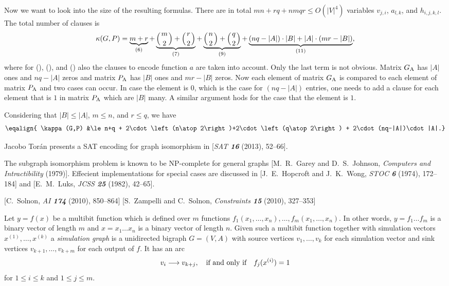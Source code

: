 \medskip{}  Now we want to look into the
size of the resulting formulas.  There are in total $mn+rq+nmqr\le O(|V|^4)$
variables $v_{j,i}$, $a_{l,k}$, and $h_{i,j,k,l}$.  The total number of clauses
is
$$
  \kappa(G,P)=
  \underbrace{m+r}_{(6)}
  + \underbrace{\left(m\atop 2\right)+\left(r\atop 2\right)}_{(7)}
  + \underbrace{\left(n\atop 2\right)+\left(q\atop 2\right)}_{(9)}
  + \underbrace{(nq-|A|)\cdot|B|+|A|\cdot(mr-|B|)}_{(11)},
$$
where for (\eqonehota), (\eqonehotb), and (\eqonehotc) also the clauses to
encode function $a$ are taken into account.  Only the last term is not obvious.
Matrix $G_{\rm A}$ has $|A|$ ones and $nq-|A|$ zeros and matrix $P_{\rm A}$ has
$|B|$ ones and $mr-|B|$ zeros.  Now each element of matrix $G_{\rm A}$ is
compared to each element of matrix $P_{\rm A}$ and two cases can occur. In case
the element is $0$, which is the case for $(nq-|A|)$ entries, one needs to add a
clause for each element that is $1$ in matrix $P_{\rm A}$ which are $|B|$ many.
A similar argument hods for the case that the element is $1$.

Considering that $|B|\le |A|$, $m\le n$, and $r\le q$, we have
$$
  \eqalign{
  \kappa(G,P) &\le
  n+q
  + 2\cdot\left(n\atop 2\right)+2\cdot\left(q\atop 2\right)
  + 2\cdot (nq-|A|)\cdot |A|.}
$$

\medskip{}


\medskip{}  Jacobo Tor\'an presents a SAT encoding
for graph isomorphism in [{\sl SAT\/ \bf 16} (2013), 52--66].

The subgraph isomorphism problem is known to be NP-complete for general graphs
[M.\ R.\ Garey and D.\ S.\ Johnson, {\sl Computers and Intractibility} (1979)].
Effecient implementations for special cases are discussed in [J.\ E.\ Hopcroft
and J.\ K.\ Wong, {\sl STOC\/ \bf 6} (1974), 172--184] and [E.\ M.\ Luks, {\sl
JCSS\/ \bf 25} (1982), 42--65].

[C.\ Solnon, {\sl AI\/ \bf 174} (2010), 850--864]  [S.\ Zampelli and C.\ Solnon, {\sl Constraints\/ \bf 15} (2010), 327--353]

\medskip{}  Let $y=f(x)$ be a multibit
function which is defined over $m$ functions $f_1(x_1,\dots,x_n), \dots,
f_m(x_1,\dots,x_n)$.  In other words, $y=f_1\dots f_m$ is a binary vector of
length $m$ and $x=x_1\dots x_n$ is a binary vector of length $n$.  Given such a
multibit function together with simulation vectors $x^{(1)},\dots, x^{(k)}$ a
{\it simulation graph\/} is a unidirected bigraph $G=(V,A)$ with source vertices
$v_1,\dots,v_k$ for each simulation vector and sink vertices
$v_{k+1}, \dots, v_{k+m}$ for each output of $f$.  It has an arc
$$ v_i \longrightarrow v_{k+j}, \quad \hbox{if and only if} \quad f_j(x^{(i)})=1 $$
for $1\le i\le k$ and $1\le j\le m$.

